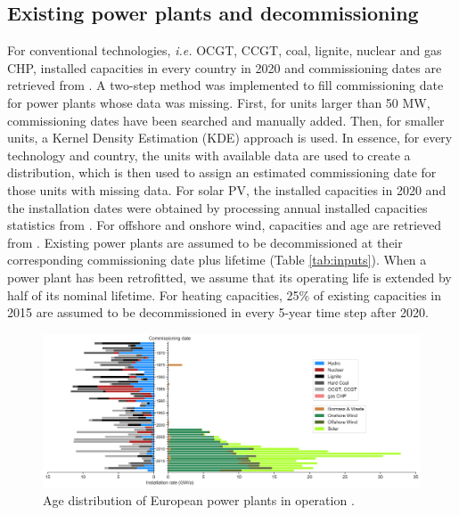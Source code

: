 \documentclass[3p]{elsarticle} %
\begin{document}
\subsection{Existing power plants and decommissioning}

For conventional technologies, \textit{i.e.} OCGT, CCGT, coal, lignite, nuclear and gas CHP, installed capacities in every country in 2020 and commissioning dates are retrieved from \cite{powerplantmatching}. 
A two-step method was implemented to fill commissioning date for power plants whose data was missing. First, for units larger than 50 MW, commissioning dates have been searched and manually added. Then, for smaller units, a Kernel Density Estimation (KDE) approach is used. In essence, for every technology and country, the units with available data are used to create a distribution, which is then used to assign an estimated commissioning date for those units with missing data. For solar PV, the installed capacities in 2020 and the installation dates were obtained by processing annual installed capacities statistics from \cite{IRENA_2019}. For offshore and onshore wind, capacities and age are retrieved from \cite{thewindpower}. Existing power plants are assumed to be decommissioned at their corresponding commissioning date plus lifetime (Table \ref{tab:inputs}). When a power plant has been retrofitted, we assume that its operating life is extended by half of its nominal lifetime. 
For heating capacities, 25\% of existing capacities in 2015 are assumed to be decommissioned in every 5-year time step after 2020.

\begin{figure}[!h]
\centering
\includegraphics[width=\textwidth]{../figures/age_distribution_existing.png}
\caption{Age distribution of European power plants in operation \cite{powerplantmatching, IRENA_2019}.} 
\end{figure}
\end{document}
